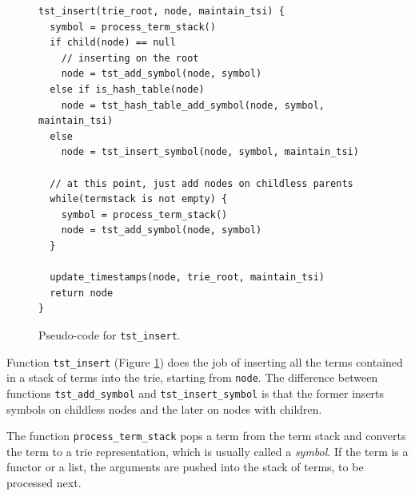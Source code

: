 \begin{figure}[ht]
\begin{Verbatim}
tst_insert(trie_root, node, maintain_tsi) {
  symbol = process_term_stack()
  if child(node) == null
    // inserting on the root
    node = tst_add_symbol(node, symbol)
  else if is_hash_table(node)
    node = tst_hash_table_add_symbol(node, symbol, maintain_tsi)
  else
    node = tst_insert_symbol(node, symbol, maintain_tsi)
  
  // at this point, just add nodes on childless parents
  while(termstack is not empty) {
    symbol = process_term_stack()
    node = tst_add_symbol(node, symbol)
  }
  
  update_timestamps(node, trie_root, maintain_tsi)
  return node
}
\end{Verbatim}
\caption{Pseudo-code for \texttt{tst\_insert}.}
\label{fig:tst_insert}
\end{figure}

Function \texttt{tst\_insert} (Figure \ref{fig:tst_insert}) does the job of inserting
all the terms contained in a stack of terms into the trie, starting from \texttt{node}.
The difference between functions \texttt{tst\_add\_symbol} and \texttt{tst\_insert\_symbol}
is that the former inserts symbols on childless nodes and the later on nodes with children.

The function \texttt{process\_term\_stack} pops a term from the term stack and converts the term
to a trie representation, which is usually called a \textit{symbol}. If the term is a functor or a list,
the arguments are pushed into the stack of terms, to be processed next.

